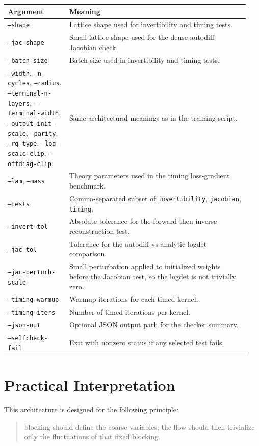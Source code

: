 \documentclass[11pt]{article}
\begin{document}
\begin{longtable}{p{0.24\linewidth}p{0.70\linewidth}}
\toprule
Argument & Meaning \\
\midrule
\endhead
\texttt{--shape} & Lattice shape used for invertibility and timing tests. \\
\texttt{--jac-shape} & Small lattice shape used for the dense autodiff Jacobian check. \\
\texttt{--batch-size} & Batch size used in invertibility and timing tests. \\
\texttt{--width}, \texttt{--n-cycles}, \texttt{--radius}, \texttt{--terminal-n-layers}, \texttt{--terminal-width}, \texttt{--output-init-scale}, \texttt{--parity}, \texttt{--rg-type}, \texttt{--log-scale-clip}, \texttt{--offdiag-clip} & Same architectural meanings as in the training script. \\
\texttt{--lam}, \texttt{--mass} & Theory parameters used in the timing loss-gradient benchmark. \\
\texttt{--tests} & Comma-separated subset of \texttt{invertibility}, \texttt{jacobian}, \texttt{timing}. \\
\texttt{--invert-tol} & Absolute tolerance for the forward-then-inverse reconstruction test. \\
\texttt{--jac-tol} & Tolerance for the autodiff-vs-analytic logdet comparison. \\
\texttt{--jac-perturb-scale} & Small perturbation applied to initialized weights before the Jacobian test, so the logdet is not trivially zero. \\
\texttt{--timing-warmup} & Warmup iterations for each timed kernel. \\
\texttt{--timing-iters} & Number of timed iterations per kernel. \\
\texttt{--json-out} & Optional JSON output path for the checker summary. \\
\texttt{--selfcheck-fail} & Exit with nonzero status if any selected test fails. \\
\bottomrule
\end{longtable}

\section{Practical Interpretation}

This architecture is designed for the following principle:
\begin{quote}
blocking should define the coarse variables; the flow should then trivialize
only the fluctuations of that fixed blocking.
\end{quote}
\end{document}
